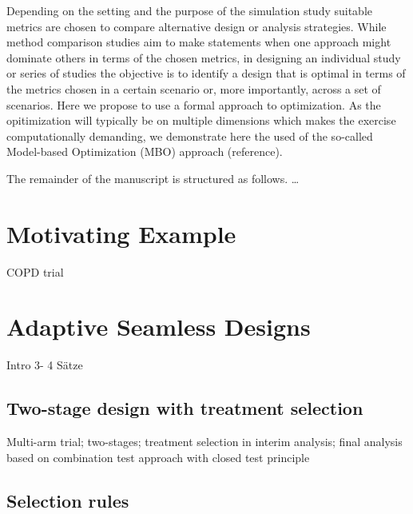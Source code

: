 \documentclass[bimj,fleqn]{w-art}
\theoremstyle{plain}
\theoremstyle{definition}
\begin{document}
Depending on the setting and the purpose of the simulation study suitable metrics are chosen to compare alternative design or analysis strategies. 
While method comparison studies aim to make statements when one approach might dominate others in terms of the chosen metrics, in designing an individual study or series of studies the objective is to identify a design that is optimal in terms of the metrics chosen in a certain scenario or, more importantly, across a set of scenarios. 
Here we propose to use a formal approach to optimization. As the opitimization will typically be on multiple dimensions which makes the exercise computationally demanding, we demonstrate here the used of the so-called Model-based Optimization (MBO) approach (reference).

The remainder of the manuscript is structured as follows. \dots 



\section{Motivating Example}
COPD trial

\section{Adaptive Seamless Designs}
Intro 3- 4 Sätze

\subsection{Two-stage design with treatment selection}
Multi-arm trial; two-stages; treatment selection in interim analysis; final analysis based on combination test approach with closed test principle


\subsection{Selection rules}
\end{document}
